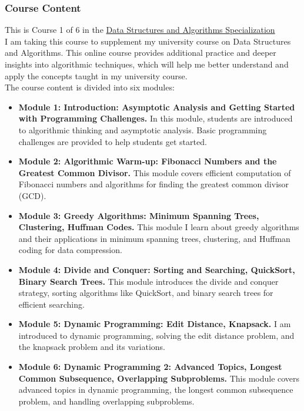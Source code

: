 \subsubsection{Course Content}
This is Course 1 of 6 in the \href{https://www.coursera.org/specializations/data-structures-algorithms}{Data Structures and Algorithms Specialization} \\

I am taking this course to supplement my university course on Data Structures and Algorithms. This online course provides additional practice and deeper insights into algorithmic techniques, which will help me better understand and apply the concepts taught in my university course.\\

The course content is divided into six modules:
\begin{itemize}
	\item \textbf{Module 1: Introduction: Asymptotic Analysis and Getting Started with Programming Challenges.} In this module, students are introduced to algorithmic thinking and asymptotic analysis. Basic programming challenges are provided to help students get started.
	\item \textbf{Module 2: Algorithmic Warm-up: Fibonacci Numbers and the Greatest Common Divisor.} This module covers efficient computation of Fibonacci numbers and algorithms for finding the greatest common divisor (GCD).
	\item \textbf{Module 3: Greedy Algorithms: Minimum Spanning Trees, Clustering, Huffman Codes.} This module I learn about greedy algorithms and their applications in minimum spanning trees, clustering, and Huffman coding for data compression.
	\item \textbf{Module 4: Divide and Conquer: Sorting and Searching, QuickSort, Binary Search Trees.} This module introduces the divide and conquer strategy, sorting algorithms like QuickSort, and binary search trees for efficient searching.
	\item \textbf{Module 5: Dynamic Programming: Edit Distance, Knapsack.} I am introduced to dynamic programming, solving the edit distance problem, and the knapsack problem and its variations.
	\item \textbf{Module 6: Dynamic Programming 2: Advanced Topics, Longest Common Subsequence, Overlapping Subproblems.} This module covers advanced topics in dynamic programming, the longest common subsequence problem, and handling overlapping subproblems.
\end{itemize}

